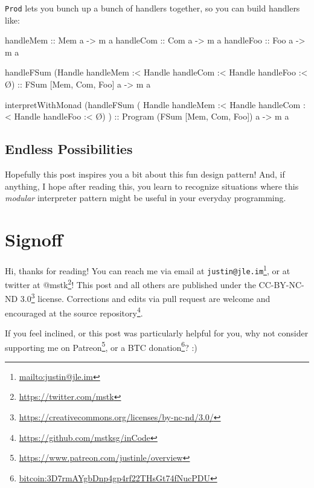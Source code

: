 \documentclass[]{article}
\newenvironment{Shaded}{}{}
\newcommand{\DataTypeTok}[1]{\textcolor[rgb]{0.56,0.13,0.00}{#1}}
\newcommand{\NormalTok}[1]{#1}
\newcommand{\OperatorTok}[1]{\textcolor[rgb]{0.40,0.40,0.40}{#1}}
\newcommand{\OtherTok}[1]{\textcolor[rgb]{0.00,0.44,0.13}{#1}}
\renewcommand{\href}[2]{#2\footnote{\url{#1}}}
\begin{document}
\texttt{Prod} lets you bunch up a bunch of handlers together, so you can build
handlers like:

\begin{Shaded}
\begin{Highlighting}[]
\OtherTok{handleMem ::} \DataTypeTok{Mem}\NormalTok{ a }\OtherTok{{-}\textgreater{}}\NormalTok{ m a}
\OtherTok{handleCom ::} \DataTypeTok{Com}\NormalTok{ a }\OtherTok{{-}\textgreater{}}\NormalTok{ m a}
\OtherTok{handleFoo ::} \DataTypeTok{Foo}\NormalTok{ a }\OtherTok{{-}\textgreater{}}\NormalTok{ m a}

\NormalTok{handleFSum (}\DataTypeTok{Handle}\NormalTok{ handleMem }\OperatorTok{:\textless{}} \DataTypeTok{Handle}\NormalTok{ handleCom }\OperatorTok{:\textless{}} \DataTypeTok{Handle}\NormalTok{ handleFoo }\OperatorTok{:\textless{}}\NormalTok{ Ø)}
\OtherTok{    ::} \DataTypeTok{FSum}\NormalTok{ \textquotesingle{}[}\DataTypeTok{Mem}\NormalTok{, }\DataTypeTok{Com}\NormalTok{, }\DataTypeTok{Foo}\NormalTok{] a }\OtherTok{{-}\textgreater{}}\NormalTok{ m a}

\NormalTok{interpretWithMonad}
\NormalTok{        (handleFSum ( }\DataTypeTok{Handle}\NormalTok{ handleMem}
                   \OperatorTok{:\textless{}} \DataTypeTok{Handle}\NormalTok{ handleCom}
                   \OperatorTok{:\textless{}} \DataTypeTok{Handle}\NormalTok{ handleFoo}
                   \OperatorTok{:\textless{}}\NormalTok{ Ø)}
\NormalTok{        )}
\OtherTok{    ::} \DataTypeTok{Program}\NormalTok{ (}\DataTypeTok{FSum}\NormalTok{ \textquotesingle{}[}\DataTypeTok{Mem}\NormalTok{, }\DataTypeTok{Com}\NormalTok{, }\DataTypeTok{Foo}\NormalTok{]) a }\OtherTok{{-}\textgreater{}}\NormalTok{ m a}
\end{Highlighting}
\end{Shaded}

\subsection{Endless Possibilities}\label{endless-possibilities}

Hopefully this post inspires you a bit about this fun design pattern! And, if
anything, I hope after reading this, you learn to recognize situations where
this \emph{modular} interpreter pattern might be useful in your everyday
programming.

\section{Signoff}\label{signoff}

Hi, thanks for reading! You can reach me via email at
\href{mailto:justin@jle.im}{\nolinkurl{justin@jle.im}}, or at twitter at
\href{https://twitter.com/mstk}{@mstk}! This post and all others are published
under the \href{https://creativecommons.org/licenses/by-nc-nd/3.0/}{CC-BY-NC-ND
3.0} license. Corrections and edits via pull request are welcome and encouraged
at \href{https://github.com/mstksg/inCode}{the source repository}.

If you feel inclined, or this post was particularly helpful for you, why not
consider \href{https://www.patreon.com/justinle/overview}{supporting me on
Patreon}, or a \href{bitcoin:3D7rmAYgbDnp4gp4rf22THsGt74fNucPDU}{BTC donation}?
:)
\end{document}

